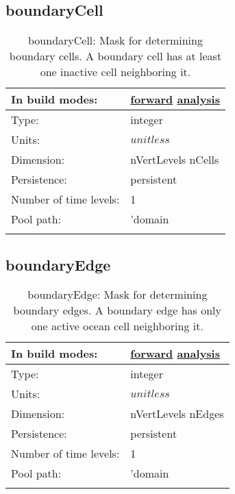 \subsection[boundaryCell]{boundaryCell}
\label{subsec:var_sec_mesh_boundaryCell}
\begin{center}
\begin{longtable}{| p{2.0in} | p{4.0in} |}
        \hline 
        In build modes: & \hyperref[subsec:forward_var_tab_mesh]{forward} \hyperref[subsec:analysis_var_tab_mesh]{analysis} \\
        \hline 
        Type: & integer \\
        \hline 
        Units: & $unitless$ \\
        \hline 
        Dimension: & nVertLevels nCells \\
        \hline 
        Persistence: & persistent \\
        \hline 
        Number of time levels: & 1 \\
        \hline 
            Pool path: & 'domain %
 \\
		 \hline 
    \caption{boundaryCell: Mask for determining boundary cells. A boundary cell has at least one inactive cell neighboring it.}
\end{longtable}
\end{center}
\subsection[boundaryEdge]{boundaryEdge}
\label{subsec:var_sec_mesh_boundaryEdge}
\begin{center}
\begin{longtable}{| p{2.0in} | p{4.0in} |}
        \hline 
        In build modes: & \hyperref[subsec:forward_var_tab_mesh]{forward} \hyperref[subsec:analysis_var_tab_mesh]{analysis} \\
        \hline 
        Type: & integer \\
        \hline 
        Units: & $unitless$ \\
        \hline 
        Dimension: & nVertLevels nEdges \\
        \hline 
        Persistence: & persistent \\
        \hline 
        Number of time levels: & 1 \\
        \hline 
            Pool path: & 'domain %
 \\
		 \hline 
    \caption{boundaryEdge: Mask for determining boundary edges. A boundary edge has only one active ocean cell neighboring it.}
\end{longtable}
\end{center}
